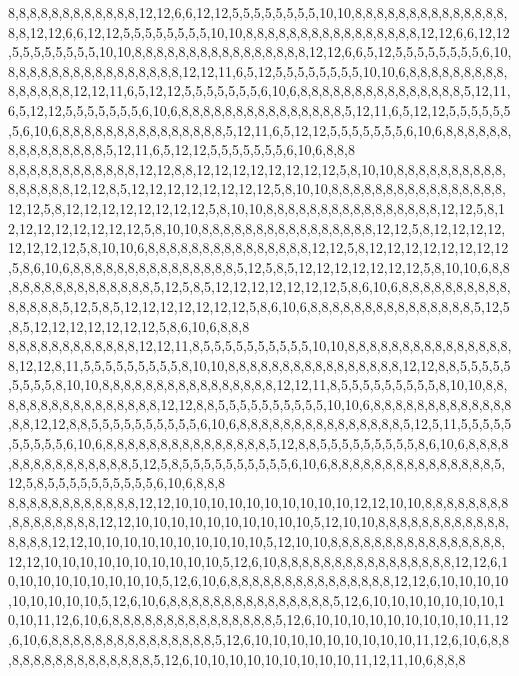 8,8,8,8,8,8,8,8,8,8,8,8,12,12,6,6,12,12,5,5,5,5,5,5,5,5,10,10,8,8,8,8,8,8,8,8,8,8,8,8,8,8,8,8,12,12,6,6,12,12,5,5,5,5,5,5,5,5,10,10,8,8,8,8,8,8,8,8,8,8,8,8,8,8,8,8,12,12,6,6,12,12,5,5,5,5,5,5,5,5,10,10,8,8,8,8,8,8,8,8,8,8,8,8,8,8,8,8,12,12,6,6,5,12,5,5,5,5,5,5,5,5,6,10,8,8,8,8,8,8,8,8,8,8,8,8,8,8,8,8,12,12,11,6,5,12,5,5,5,5,5,5,5,5,10,10,6,8,8,8,8,8,8,8,8,8,8,8,8,8,8,8,12,12,11,6,5,12,12,5,5,5,5,5,5,5,6,10,6,8,8,8,8,8,8,8,8,8,8,8,8,8,8,8,5,12,11,6,5,12,12,5,5,5,5,5,5,5,6,10,6,8,8,8,8,8,8,8,8,8,8,8,8,8,8,8,5,12,11,6,5,12,12,5,5,5,5,5,5,5,6,10,6,8,8,8,8,8,8,8,8,8,8,8,8,8,8,8,5,12,11,6,5,12,12,5,5,5,5,5,5,5,6,10,6,8,8,8,8,8,8,8,8,8,8,8,8,8,8,8,5,12,11,6,5,12,12,5,5,5,5,5,5,5,6,10,6,8,8,8
8,8,8,8,8,8,8,8,8,8,8,8,12,12,8,8,12,12,12,12,12,12,12,12,5,8,10,10,8,8,8,8,8,8,8,8,8,8,8,8,8,8,8,8,12,12,8,5,12,12,12,12,12,12,12,12,5,8,10,10,8,8,8,8,8,8,8,8,8,8,8,8,8,8,8,8,12,12,5,8,12,12,12,12,12,12,12,12,5,8,10,10,8,8,8,8,8,8,8,8,8,8,8,8,8,8,8,8,12,12,5,8,12,12,12,12,12,12,12,12,5,8,10,10,8,8,8,8,8,8,8,8,8,8,8,8,8,8,8,8,12,12,5,8,12,12,12,12,12,12,12,12,5,8,10,10,6,8,8,8,8,8,8,8,8,8,8,8,8,8,8,8,12,12,5,8,12,12,12,12,12,12,12,12,5,8,6,10,6,8,8,8,8,8,8,8,8,8,8,8,8,8,8,8,5,12,5,8,5,12,12,12,12,12,12,12,5,8,10,10,6,8,8,8,8,8,8,8,8,8,8,8,8,8,8,8,5,12,5,8,5,12,12,12,12,12,12,12,5,8,6,10,6,8,8,8,8,8,8,8,8,8,8,8,8,8,8,8,5,12,5,8,5,12,12,12,12,12,12,12,5,8,6,10,6,8,8,8,8,8,8,8,8,8,8,8,8,8,8,8,5,12,5,8,5,12,12,12,12,12,12,12,5,8,6,10,6,8,8,8
8,8,8,8,8,8,8,8,8,8,8,8,12,12,11,8,5,5,5,5,5,5,5,5,5,5,10,10,8,8,8,8,8,8,8,8,8,8,8,8,8,8,8,8,12,12,8,11,5,5,5,5,5,5,5,5,5,8,10,10,8,8,8,8,8,8,8,8,8,8,8,8,8,8,8,8,12,12,8,8,5,5,5,5,5,5,5,5,5,8,10,10,8,8,8,8,8,8,8,8,8,8,8,8,8,8,8,8,12,12,11,8,5,5,5,5,5,5,5,5,5,8,10,10,8,8,8,8,8,8,8,8,8,8,8,8,8,8,8,8,12,12,8,8,5,5,5,5,5,5,5,5,5,5,10,10,6,8,8,8,8,8,8,8,8,8,8,8,8,8,8,8,12,12,8,8,5,5,5,5,5,5,5,5,5,5,6,10,6,8,8,8,8,8,8,8,8,8,8,8,8,8,8,8,5,12,5,11,5,5,5,5,5,5,5,5,5,5,6,10,6,8,8,8,8,8,8,8,8,8,8,8,8,8,8,8,5,12,8,8,5,5,5,5,5,5,5,5,5,8,6,10,6,8,8,8,8,8,8,8,8,8,8,8,8,8,8,8,5,12,5,8,5,5,5,5,5,5,5,5,5,5,6,10,6,8,8,8,8,8,8,8,8,8,8,8,8,8,8,8,5,12,5,8,5,5,5,5,5,5,5,5,5,5,6,10,6,8,8,8
8,8,8,8,8,8,8,8,8,8,8,8,12,12,10,10,10,10,10,10,10,10,10,10,12,12,10,10,8,8,8,8,8,8,8,8,8,8,8,8,8,8,8,8,12,12,10,10,10,10,10,10,10,10,10,10,5,12,10,10,8,8,8,8,8,8,8,8,8,8,8,8,8,8,8,8,12,12,10,10,10,10,10,10,10,10,10,10,5,12,10,10,8,8,8,8,8,8,8,8,8,8,8,8,8,8,8,8,12,12,10,10,10,10,10,10,10,10,10,10,5,12,6,10,8,8,8,8,8,8,8,8,8,8,8,8,8,8,8,8,12,12,6,10,10,10,10,10,10,10,10,10,5,12,6,10,6,8,8,8,8,8,8,8,8,8,8,8,8,8,8,8,12,12,6,10,10,10,10,10,10,10,10,10,5,12,6,10,6,8,8,8,8,8,8,8,8,8,8,8,8,8,8,8,5,12,6,10,10,10,10,10,10,10,10,10,11,12,6,10,6,8,8,8,8,8,8,8,8,8,8,8,8,8,8,8,5,12,6,10,10,10,10,10,10,10,10,10,11,12,6,10,6,8,8,8,8,8,8,8,8,8,8,8,8,8,8,8,5,12,6,10,10,10,10,10,10,10,10,10,11,12,6,10,6,8,8,8,8,8,8,8,8,8,8,8,8,8,8,8,5,12,6,10,10,10,10,10,10,10,10,10,11,12,11,10,6,8,8,8
